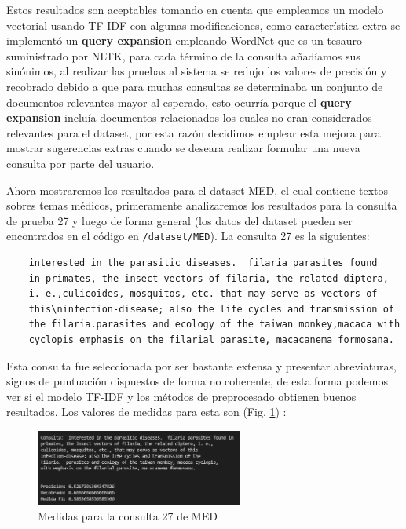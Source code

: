 \documentclass[runningheads,a4paper]{llncs}
\begin{document}
Estos resultados son aceptables tomando en cuenta que empleamos un modelo vectorial usando TF-IDF con algunas modificaciones, como característica extra se implementó un \textbf{query expansion} empleando WordNet que es un tesauro suministrado por NLTK, para cada término de la consulta añadíamos sus sinónimos, al realizar las pruebas al sistema se redujo los valores de precisión y recobrado debido a que para muchas consultas se determinaba un conjunto de documentos relevantes mayor al esperado, esto ocurría porque el \textbf{query expansion} incluía documentos relacionados los cuales no eran considerados relevantes para el dataset, por esta razón decidimos emplear esta mejora para mostrar sugerencias extras cuando se deseara realizar formular una nueva consulta por parte del usuario.

Ahora mostraremos los resultados para el dataset MED, el cual contiene textos sobres temas médicos, primeramente analizaremos los resultados para la consulta de prueba 27 y luego de forma general (los datos del dataset pueden ser encontrados en el código en \verb*|/dataset/MED|). La consulta 27 es la siguientes:

\begin{verbatim}
	interested in the parasitic diseases.  filaria parasites found 
	in primates, the insect vectors of filaria, the related diptera, 
	i. e.,culicoides, mosquitos, etc. that may serve as vectors of 
	this\ninfection-disease; also the life cycles and transmission of 
	the filaria.parasites and ecology of the taiwan monkey,macaca with
	cyclopis emphasis on the filarial parasite, macacanema formosana.
\end{verbatim}

Esta consulta fue seleccionada por ser bastante extensa y presentar abreviaturas, signos de puntuación dispuestos de forma no coherente, de esta forma podemos ver si el modelo TF-IDF y los métodos de preprocesado  obtienen buenos resultados. Los valores de medidas para esta son (Fig. \ref{fig:med1}) :

\begin{figure}
	\centering
	\includegraphics[height=2.5cm]{imgs/eval_query27_med.png}
	\caption{Medidas para la consulta 27 de MED}
	\label{fig:med1}
\end{figure}
\end{document}
